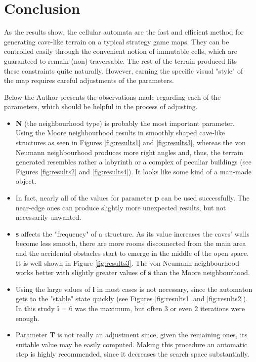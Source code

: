 \documentclass[a4paper, 11pt]{article} %
\begin{document}

\section*{Conclusion}

As the results show, the cellular automata are the fast and efficient method for generating cave-like terrain on a typical strategy game maps. They can be controlled easily through the convenient notion of immutable cells, which are guaranteed to remain (non)-traversable. The rest of the terrain produced fits these constraints quite naturally. However, earning the specific visual "style" of the map requires careful adjustments of the parameters.

Below the Author presents the observations made regarding each of the parameters, which should be helpful in the process of adjusting.

\begin{itemize}
        \item \textbf{N} (the neighbourhood type) is probably the most important parameter. Using the Moore neighbourhood results in smoothly shaped cave-like structures as seen in Figures \ref{fig:results1} and \ref{fig:results3}, whereas the von Neumann neighbourhood produces more right angles and, thus, the terrain generated resembles rather a labyrinth or a complex of peculiar buildings (see Figures \ref{fig:results2} and \ref{fig:results4}). It looks like some kind of a man-made object. 
	\item In fact, nearly all of the values for parameter \textbf{p} can be used successfully. The near-edge ones can produce slightly more unexpected results, but not necessarily unwanted.
	\item \textbf{s} affects the "frequency" of a structure. As its value increases the caves' walls become less smooth, there are more rooms disconnected from the main area and the accidental obstacles start to emerge in the middle of the open space. It is well shown in Figure \ref{fig:results3}. The von Neumann neighbourhood works better with slightly greater values of \textbf{s} than the Moore neighbourhood.
	\item Using the large values of \textbf{i} in most cases is not necessary, since the automaton gets to the "stable" state quickly (see Figures \ref{fig:results1} and \ref{fig:results2}). In this study \textbf{i} = 6 was the maximum, but often 3 or even 2 iterations were enough.
        \item Parameter \textbf{T} is not really an adjustment since, given the remaining ones, its suitable value may be easily computed. Making this procedure an automatic step is highly recommended, since it decreases the search space substantially.
\end{itemize}
\end{document}
